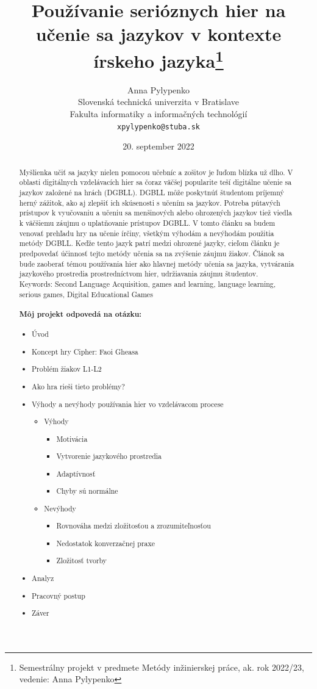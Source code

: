 \documentclass[10pt,twoside,slovak,a4paper]{article}
\title{Používanie serióznych hier na učenie sa jazykov v kontexte írskeho jazyka\thanks{Semestrálny projekt v predmete Metódy inžinierskej práce, ak. rok 2022/23, vedenie: Anna Pylypenko}} %
\author{Anna Pylypenko\\[2pt]
	{\small Slovenská technická univerzita v Bratislave}\\
	{\small Fakulta informatiky a informačných technológií}\\
	{\small \texttt{xpylypenko@stuba.sk}}
	}
\date{\small 20. september 2022} %
\begin{document}
\maketitle

\begin{abstract}
Myšlienka učiť sa jazyky nielen pomocou učebníc a zošitov je ľuďom blízka už dlho. V oblasti digitálnych vzdelávacích hier sa čoraz väčšej popularite teší digitálne učenie sa jazykov založené na hrách (DGBLL). DGBLL môže poskytnúť študentom príjemný herný zážitok, ako aj zlepšiť ich skúsenosti s učením sa jazykov. Potreba pútavých prístupov k vyučovaniu a učeniu sa menšinových alebo ohrozených jazykov tiež viedla k väčšiemu záujmu o uplatňovanie prístupov DGBLL. V tomto článku sa budem venovať prehľadu hry na učenie írčiny, všetkým výhodám a nevýhodám použitia metódy DGBLL. Keďže tento jazyk patrí medzi ohrozené jazyky, cieľom článku je predpovedať účinnosť tejto metódy učenia sa na zvýšenie záujmu žiakov. Článok sa bude zaoberať témou používania hier ako hlavnej metódy učenia sa jazyka, vytvárania jazykového prostredia prostredníctvom hier, udržiavania záujmu študentov.\\
\quad Keywords: Second Language Acquisition, games and learning, language learning, serious games, Digital Educational Games\\

\paragraph{Môj projekt odpovedá na otázku:}
\begin{itemize}
\item Úvod
\item Koncept hry Cipher: Faoi Gheasa
\item Problém žiakov L1-L2
\item Ako hra rieši tieto problémy? 
\item Výhody a nevýhody používania hier vo vzdelávacom procese
\begin{itemize}
\item Výhody
\begin{itemize}
\item Motivácia
\item Vytvorenie jazykového prostredia
\item Adaptívnosť
\item Chyby sú normálne
\end{itemize}
\item Nevýhody
\begin{itemize}
\item Rovnováha medzi zložitosťou a zrozumiteľnosťou
\item Nedostatok konverzačnej praxe
\item Zložitosť tvorby
\end{itemize}
\end{itemize}
\item Analyz
\item Pracovný postup
\item Záver
\end{itemize}

\end{abstract}
\end{document}
